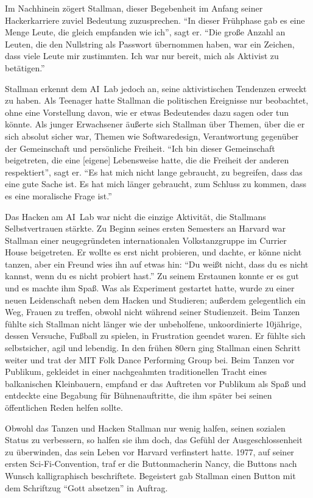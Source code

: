 Im Nachhinein zögert Stallman, dieser Begebenheit im Anfang seiner Hackerkarriere zuviel Bedeutung zuzusprechen. "`In dieser Frühphase gab es eine Menge Leute, die gleich empfanden wie ich"', sagt er. "`Die große Anzahl an Leuten, die den Nullstring als Passwort übernommen haben, war ein Zeichen, dass viele Leute mir zustimmten. Ich war nur bereit, mich als Aktivist zu betätigen."'

Stallman erkennt dem AI~Lab jedoch an, seine aktivistischen Tendenzen erweckt zu haben. Als Teenager hatte Stallman die politischen Ereignisse nur beobachtet, ohne eine Vorstellung davon, wie er etwas Bedeutendes dazu sagen oder tun könnte. Als junger Erwachsener äußerte sich Stallman über Themen, über die er sich absolut sicher war, Themen wie Softwaredesign, Verantwortung gegenüber der Gemeinschaft und persönliche Freiheit. "`Ich bin dieser Gemeinschaft beigetreten, die eine [eigene] Lebensweise hatte, die die Freiheit der anderen respektiert"', sagt er. "`Es hat mich nicht lange gebraucht, zu begreifen, dass das eine gute Sache ist. Es hat mich länger gebraucht, zum Schluss zu kommen, dass es eine moralische Frage ist."'

Das Hacken am AI~Lab war nicht die einzige Aktivität, die Stallmans Selbstvertrauen stärkte. Zu Beginn seines ersten Semesters an Harvard war Stallman einer neugegründeten internationalen Volkstanzgruppe im Currier House beigetreten. Er wollte es erst nicht probieren, und dachte, er könne nicht tanzen, aber ein Freund wies ihn auf etwas hin: "`Du weißt nicht, dass du es nicht kannst, wenn du es nicht probiert hast."' Zu seinem Erstaunen konnte er es gut und es machte ihm Spaß. Was als Experiment gestartet hatte, wurde zu einer neuen Leidenschaft neben dem Hacken und Studieren; außerdem gelegentlich ein Weg, Frauen zu treffen, obwohl nicht während seiner Studienzeit. Beim Tanzen fühlte sich Stallman nicht länger wie der unbeholfene, unkoordinierte 10jährige, dessen Versuche, Fußball zu spielen, in Frustration geendet waren. Er fühlte sich selbstsicher, agil und lebendig. In den frühen 80ern ging Stallman einen Schritt weiter und trat der MIT Folk Dance Performing Group bei. Beim Tanzen vor Publikum, gekleidet in einer nachgeahmten traditionellen Tracht eines balkanischen Kleinbauern, empfand er das Auftreten vor Publikum als Spaß und entdeckte eine Begabung für Bühnenauftritte, die ihm später bei seinen öffentlichen Reden helfen sollte.

Obwohl das Tanzen und Hacken Stallman nur wenig halfen, seinen sozialen Status zu verbessern, so halfen sie ihm doch, das Gefühl der Ausgeschlossenheit zu überwinden, das sein Leben vor Harvard verfinstert hatte. 1977, auf seiner ersten Sci-Fi-Convention, traf er die Buttonmacherin Nancy, die Buttons nach Wunsch kalligraphisch beschriftete. Begeistert gab Stallman einen Button mit dem Schriftzug "`Gott absetzen"' in Auftrag.

